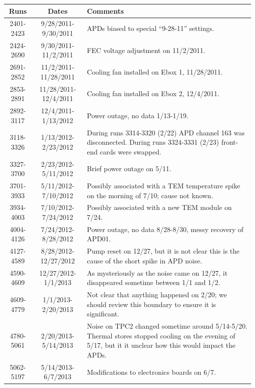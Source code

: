 \begin{table}
\begin{singlespace}
\begin{center}
\begin{tabular}{|c|c|p{}|}\hline
Runs & Dates & Comments \\\hline
2401-2423 & 9/28/2011-9/30/2011 & APDs biased to special ``9-28-11'' settings. \\\hline
2424-2690 & 9/30/2011-11/2/2011 & FEC voltage adjustment on 11/2/2011. \\\hline
2691-2852 & 11/2/2011-11/28/2011 & Cooling fan installed on Ebox 1, 11/28/2011. \\\hline
2853-2891 & 11/28/2011-12/4/2011 & Cooling fan installed on Ebox 2, 12/4/2011. \\\hline
2892-3117 & 12/4/2011-1/13/2012 & Power outage, no data 1/13-1/19. \\\hline
3118-3326 & 1/13/2012-2/23/2012 & During runs 3314-3320 (2/22) APD channel 163 was disconnected.  During runs 3324-3331 (2/23) front-end cards were swapped.\\\hline
3327-3700 & 2/23/2012-5/11/2012 & Brief power outage on 5/11. \\\hline
3701-3933 & 5/11/2012-7/10/2012 & Possibly associated with a TEM temperature spike on the morning of 7/10; cause not known. \\\hline
3934-4003 & 7/10/2012-7/24/2012 & Possibly associated with a new TEM module on 7/24. \\\hline
4004-4126 & 7/24/2012-8/28/2012 & Power outage, no data 8/28-8/30, messy recovery of APD01. \\\hline
4127-4589 & 8/28/2012-12/27/2012 & Pump reset on 12/27, but it is not clear this is the cause of the short spike in APD noise. \\\hline
4590-4609 & 12/27/2012-1/1/2013 & As mysteriously as the noise came on 12/27, it disappeared sometime between 1/1 and 1/2. \\\hline
4609-4779 & 1/1/2013-2/20/2013 & Not clear that anything happened on 2/20; we should review this boundary to ensure it is significant. \\\hline
4780-5061 & 2/20/2013-5/14/2013 & Noise on TPC2 changed sometime around 5/14-5/20.  Thermal stores stopped cooling on the evening of 5/17, but it it unclear how this would impact the APDs. \\\hline
5062-5197 & 5/14/2013-6/7/2013 & Modifications to electronics boards on 6/7. \\\hline

\end{tabular}
\end{center}
\end{singlespace}
\end{table}
